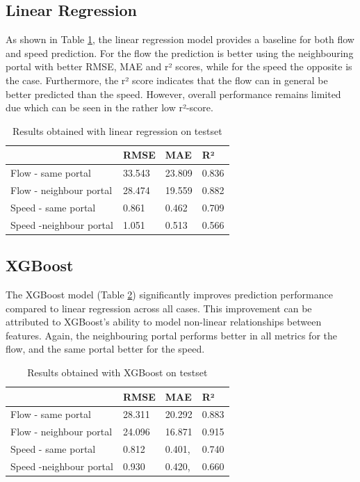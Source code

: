 	\subsection{Linear Regression}
	As shown in Table \ref{tab:result_linear}, the linear regression model provides a baseline for both flow and speed prediction.
	For the flow the prediction is better using the neighbouring portal with better RMSE, MAE and r² scores, while for the speed the opposite is the case. 
	Furthermore, the r² score indicates that the flow can in general be better predicted than the speed. 
	However, overall performance remains limited due which can be seen in the rather low r²-score.
	\begin{table}[H]
		\centering
		\caption{Results obtained with linear regression on testset}
		\label{tab:result_linear}
		\begin{tabular}{l|lll}
			& RMSE   & MAE    & R²    \\
			\hline 
			Flow - same portal      & 33.543 & 23.809 & 0.836 \\
			Flow - neighbour portal & 28.474 & 19.559 & 0.882 \\
			Speed - same portal     & 0.861  & 0.462  & 0.709 \\
			Speed -neighbour portal & 1.051  & 0.513  & 0.566
		\end{tabular}
	\end{table}
	\subsection{XGBoost}
	The XGBoost model (Table \ref{tab:result_xgb}) significantly improves prediction performance compared to linear regression across all cases. This improvement can be attributed to XGBoost's ability to model non-linear relationships between features.
	Again, the neighbouring portal performs better in all metrics for the flow, and the same portal better for the speed.
	\begin{table}[H]
		\centering
		\caption{Results obtained with XGBoost on testset}
		\label{tab:result_xgb}
		\begin{tabular}{l|lll}
			& RMSE   & MAE    & R²    \\
			\hline
			Flow - same portal      &28.311 & 20.292& 0.883 \\
			Flow - neighbour portal &  24.096 & 16.871 & 0.915 \\
			Speed - same portal     & 0.812 &0.401, &0.740 \\
			Speed -neighbour portal & 0.930&0.420, & 0.660
		\end{tabular}
	\end{table}
